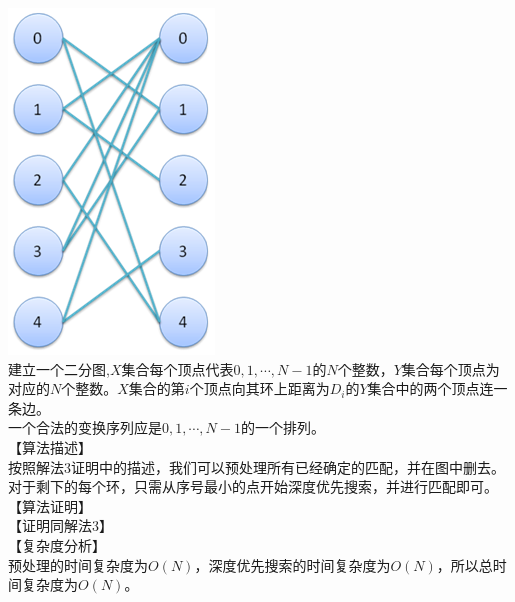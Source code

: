 \documentclass[12pt,twiside,a4paper]{ctexbook}
\numberwithin{chapter}{part}
\begin{document}
\includegraphics[scale=0.5]{transform.png}\\
建立一个二分图,$X$集合每个顶点代表$0,1,\cdots,N-1$的$N$个整数，$Y$集合每个顶点为对应的$N$个整数。$X$集合的第$i$个顶点向其环上距离为$D_i$的$Y$集合中的两个顶点连一条边。\\
一个合法的变换序列应是$0,1,\cdots,N-1$的一个排列。\\
【算法描述】\\
按照解法3证明中的描述，我们可以预处理所有已经确定的匹配，并在图中删去。对于剩下的每个环，只需从序号最小的点开始深度优先搜索，并进行匹配即可。\\
【算法证明】\\
【证明同解法3】\\
【复杂度分析】\\
预处理的时间复杂度为$O(N)$，深度优先搜索的时间复杂度为$O(N)$，所以总时间复杂度为$O(N)$。
\end{document}
